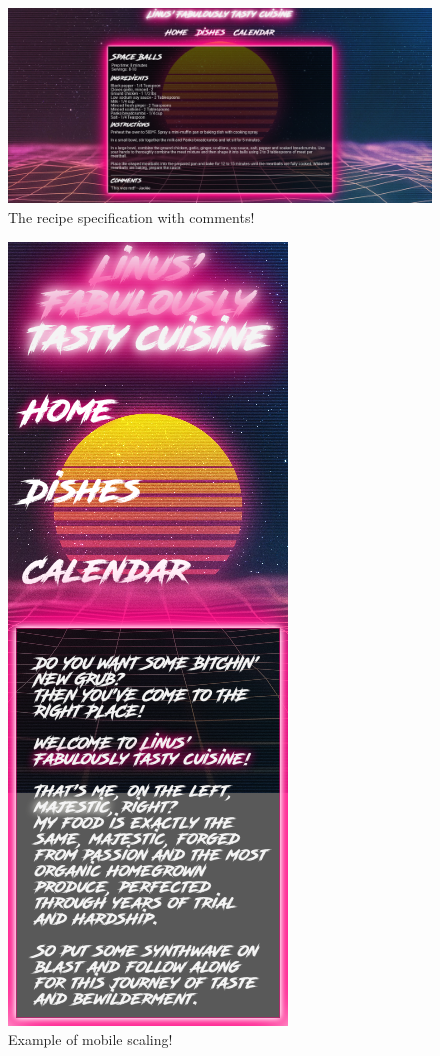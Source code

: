 \documentclass[a4paper]{scrartcl}
\begin{document}
\begin{figure}[H]
  \begin{center}
    \includegraphics[scale=0.25]{Scr4.jpg}
    \caption{The recipe specification with comments!}
    \label{fig:recipe}
  \end{center}
\end{figure}
\begin{figure}[H]
  \begin{center}
    \includegraphics[scale=0.35]{Scr5.png}
    \caption{Example of mobile scaling!}
    \label{fig:recipe}
  \end{center}
\end{figure}
\end{document}
